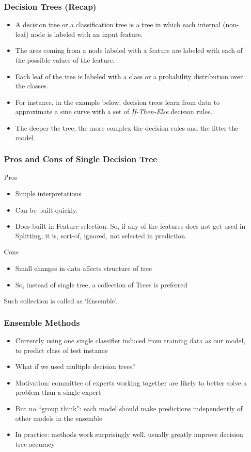 \begin{frame}[fragile]\frametitle{Decision Trees (Recap)}
\begin{itemize}
	\item A decision tree or a classification tree is a tree in which each internal (non-leaf) node is labeled with an input feature. 
	\item The arcs coming from a node labeled with a feature are labeled with each of the possible values of the feature.
	\item Each leaf of the tree is labeled with a class or a probability distribution over the classes.
\item For instance, in the example below, decision trees learn from data to approximate a sine curve with a set of \textit{If-Then-Else} decision rules. 
\item The deeper the tree, the more complex the decision rules and the fitter the model.
\end{itemize}
\end{frame}

\begin{frame}[fragile]\frametitle{Pros and Cons of Single Decision Tree}
Pros
\begin{itemize}
\item Simple interpretations
\item Can be built quickly.
\item Does built-in Feature selection. So, if any of the features does not get used in Splitting, it is, sort-of, ignored, not selected in prediction.
\end{itemize}
Cons
\begin{itemize}
\item Small changes in data affects structure of tree
\item So, instead of single tree, a collection of Trees is preferred
\end{itemize}
Such collection is called as `Ensemble'.
\end{frame}

\begin{frame}[fragile]\frametitle{Ensemble Methods}
\begin{itemize}
\item Currently using one single classifier induced from training data as our model, to predict class of test instance
\item What if we used multiple decision trees?
\item Motivation: committee of experts working together are likely to better solve a problem than a single expert
\item But no ``group think'': each model should make predictions independently of other models in the ensemble
\item In practice: methods work surprisingly well, usually greatly improve decision tree accuracy
\end{itemize}
\end{frame}

